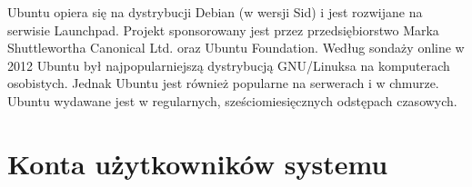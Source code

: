 \documentclass{article}
\begin{document}
Ubuntu opiera się na dystrybucji Debian (w wersji Sid) i jest rozwijane na serwisie Launchpad. Projekt sponsorowany jest przez przedsiębiorstwo Marka Shuttlewortha Canonical Ltd. oraz Ubuntu Foundation. Według sondaży online w 2012 Ubuntu był najpopularniejszą dystrybucją GNU/Linuksa na komputerach osobistych. Jednak Ubuntu jest również popularne na serwerach i w chmurze. Ubuntu wydawane jest w regularnych, sześciomiesięcznych odstępach czasowych.

\section{Konta użytkowników systemu}
\end{document}
